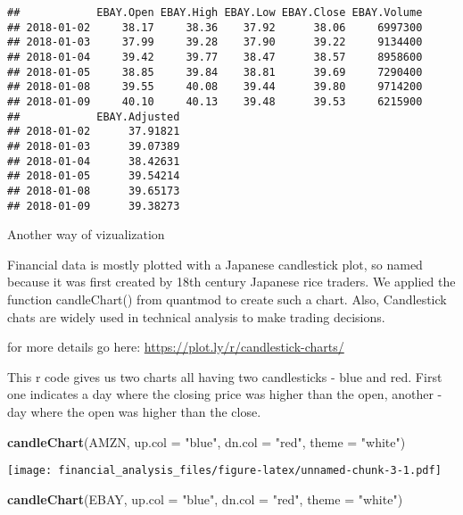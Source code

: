 \documentclass[]{article}
\newenvironment{Shaded}{\begin{snugshade}}{\end{snugshade}}
\newcommand{\KeywordTok}[1]{\textcolor[rgb]{0.13,0.29,0.53}{\textbf{#1}}}
\newcommand{\DataTypeTok}[1]{\textcolor[rgb]{0.13,0.29,0.53}{#1}}
\newcommand{\StringTok}[1]{\textcolor[rgb]{0.31,0.60,0.02}{#1}}
\newcommand{\NormalTok}[1]{#1}
\begin{document}
\begin{verbatim}
##            EBAY.Open EBAY.High EBAY.Low EBAY.Close EBAY.Volume
## 2018-01-02     38.17     38.36    37.92      38.06     6997300
## 2018-01-03     37.99     39.28    37.90      39.22     9134400
## 2018-01-04     39.42     39.77    38.47      38.57     8958600
## 2018-01-05     38.85     39.84    38.81      39.69     7290400
## 2018-01-08     39.55     40.08    39.44      39.80     9714200
## 2018-01-09     40.10     40.13    39.48      39.53     6215900
##            EBAY.Adjusted
## 2018-01-02      37.91821
## 2018-01-03      39.07389
## 2018-01-04      38.42631
## 2018-01-05      39.54214
## 2018-01-08      39.65173
## 2018-01-09      39.38273
\end{verbatim}

Another way of vizualization

Financial data is mostly plotted with a Japanese candlestick plot, so
named because it was first created by 18th century Japanese rice
traders. We applied the function candleChart() from quantmod to create
such a chart. Also, Candlestick chats are widely used in technical
analysis to make trading decisions.

for more details go here: \url{https://plot.ly/r/candlestick-charts/}

This r code gives us two charts all having two candlesticks - blue and
red. First one indicates a day where the closing price was higher than
the open, another - day where the open was higher than the close.

\begin{Shaded}
\begin{Highlighting}[]
\KeywordTok{candleChart}\NormalTok{(AMZN, }\DataTypeTok{up.col =} \StringTok{"blue"}\NormalTok{, }\DataTypeTok{dn.col =} \StringTok{"red"}\NormalTok{, }\DataTypeTok{theme =} \StringTok{"white"}\NormalTok{)}
\end{Highlighting}
\end{Shaded}

\texttt{[image: financial\_analysis\_files/figure-latex/unnamed-chunk-3-1.pdf]}

\begin{Shaded}
\begin{Highlighting}[]
\KeywordTok{candleChart}\NormalTok{(EBAY, }\DataTypeTok{up.col =} \StringTok{"blue"}\NormalTok{, }\DataTypeTok{dn.col =} \StringTok{"red"}\NormalTok{, }\DataTypeTok{theme =} \StringTok{"white"}\NormalTok{)}
\end{Highlighting}
\end{Shaded}
\end{document}
